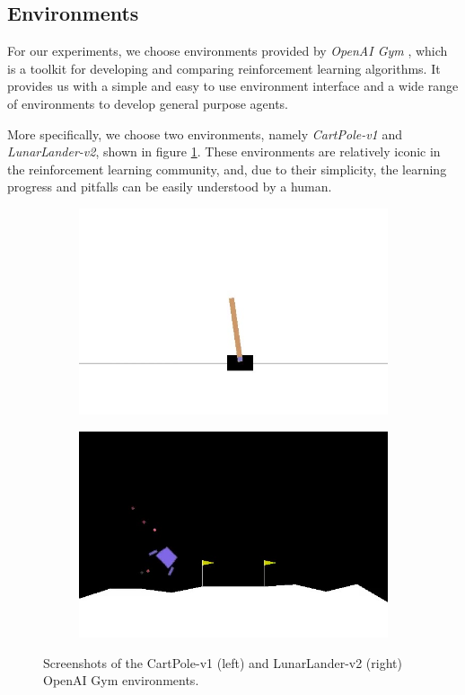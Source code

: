 \subsection{Environments}
For our experiments, we choose environments provided by \textit{OpenAI Gym} \cite{gym}, which is a toolkit for developing and comparing reinforcement learning algorithms. It provides us with a simple and easy to use environment interface and a wide range of environments to develop general purpose agents.

More specifically, we choose two environments, namely \textit{CartPole-v1} and \textit{LunarLander-v2}, shown in figure \ref{fig:environments}. These environments are relatively iconic in the reinforcement learning community, and, due to their simplicity, the learning progress and pitfalls can be easily understood by a human.
\begin{figure}[h]
    \centering
    \begin{subfigure}{0.49\textwidth}
        \raggedleft
        \includegraphics[width=\textwidth]{assets/cartpole.jpg}
    \end{subfigure}
    \begin{subfigure}{0.5\textwidth}
        \raggedright
        \includegraphics[width=\textwidth]{assets/lunarlander.jpg}
    \end{subfigure}
    \caption{Screenshots of the CartPole-v1 (left) and LunarLander-v2 (right) OpenAI Gym environments.}
    \label{fig:environments}
\end{figure}
